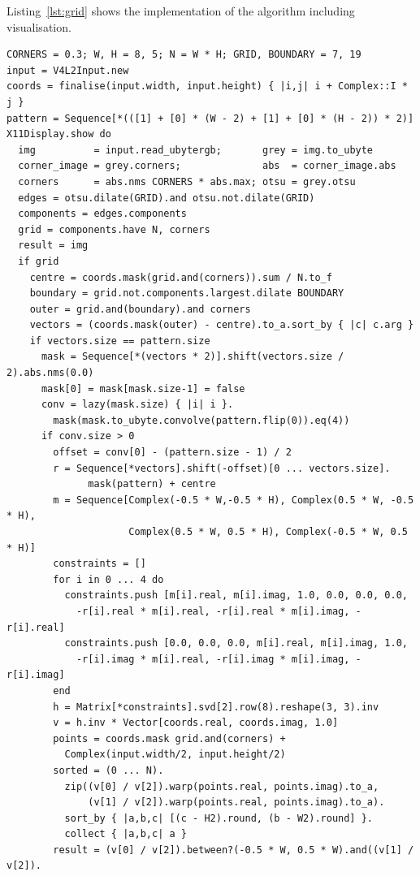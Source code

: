 \documentclass[12pt,a4paper,oneside,openright]{book}
\newcommand{\lst}[1]{Listing~\ref{lst:#1}}
\begin{document}
\begin{CJK}{UTF8}{}
\lst{grid} shows the implementation of the algorithm including visualisation.
\lstset{language=Ruby,frame=single,numbers=left}
\begin{lstlisting}[float,caption={Custom algorithm for labelling the corners of a calibration grid},escapechar=\$,label=lst:grid]
CORNERS = 0.3; W, H = 8, 5; N = W * H; GRID, BOUNDARY = 7, 19
input = V4L2Input.new
coords = finalise(input.width, input.height) { |i,j| i + Complex::I * j }
pattern = Sequence[*(([1] + [0] * (W - 2) + [1] + [0] * (H - 2)) * 2)]
X11Display.show do
  img          = input.read_ubytergb;       grey = img.to_ubyte
  corner_image = grey.corners;              abs  = corner_image.abs
  corners      = abs.nms CORNERS * abs.max; otsu = grey.otsu
  edges = otsu.dilate(GRID).and otsu.not.dilate(GRID)
  components = edges.components
  grid = components.have N, corners
  result = img
  if grid
    centre = coords.mask(grid.and(corners)).sum / N.to_f
    boundary = grid.not.components.largest.dilate BOUNDARY
    outer = grid.and(boundary).and corners
    vectors = (coords.mask(outer) - centre).to_a.sort_by { |c| c.arg }
    if vectors.size == pattern.size
      mask = Sequence[*(vectors * 2)].shift(vectors.size / 2).abs.nms(0.0)
      mask[0] = mask[mask.size-1] = false
      conv = lazy(mask.size) { |i| i }.
        mask(mask.to_ubyte.convolve(pattern.flip(0)).eq(4))
      if conv.size > 0
        offset = conv[0] - (pattern.size - 1) / 2
        r = Sequence[*vectors].shift(-offset)[0 ... vectors.size].
              mask(pattern) + centre
        m = Sequence[Complex(-0.5 * W,-0.5 * H), Complex(0.5 * W, -0.5 * H),
                     Complex(0.5 * W, 0.5 * H), Complex(-0.5 * W, 0.5 * H)]
        constraints = []
        for i in 0 ... 4 do
          constraints.push [m[i].real, m[i].imag, 1.0, 0.0, 0.0, 0.0,
            -r[i].real * m[i].real, -r[i].real * m[i].imag, -r[i].real]
          constraints.push [0.0, 0.0, 0.0, m[i].real, m[i].imag, 1.0,
            -r[i].imag * m[i].real, -r[i].imag * m[i].imag, -r[i].imag]
        end
        h = Matrix[*constraints].svd[2].row(8).reshape(3, 3).inv
        v = h.inv * Vector[coords.real, coords.imag, 1.0]
        points = coords.mask grid.and(corners) +
          Complex(input.width/2, input.height/2)
        sorted = (0 ... N).
          zip((v[0] / v[2]).warp(points.real, points.imag).to_a,
              (v[1] / v[2]).warp(points.real, points.imag).to_a).
          sort_by { |a,b,c| [(c - H2).round, (b - W2).round] }.
          collect { |a,b,c| a }
        result = (v[0] / v[2]).between?(-0.5 * W, 0.5 * W).and((v[1] / v[2]).

\end{lstlisting}
\end{CJK}
\end{document}
